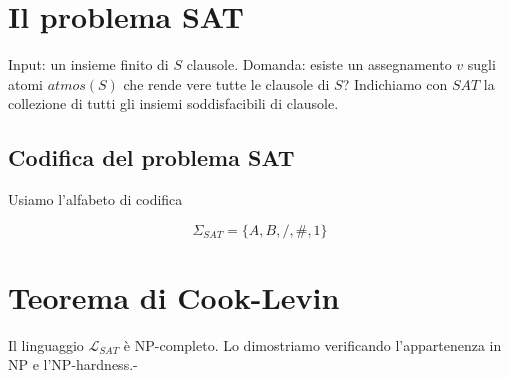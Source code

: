 \section{Il problema SAT}
Input: un insieme finito di $S$ clausole. Domanda: esiste un assegnamento $v$ sugli atomi $atmos(S)$ che rende vere tutte le clausole di $S$? Indichiamo con $SAT$ la collezione di tutti gli insiemi soddisfacibili di clausole.

\subsection{Codifica del problema SAT}

Usiamo l'alfabeto di codifica 

$$
\Sigma_{SAT} = \{A,B,/,\#,1 \}
$$


\section{Teorema di Cook-Levin}

Il linguaggio $\mathscr{L}_{SAT}$ è NP-completo. Lo dimostriamo verificando l'appartenenza in NP e l'NP-hardness.-
